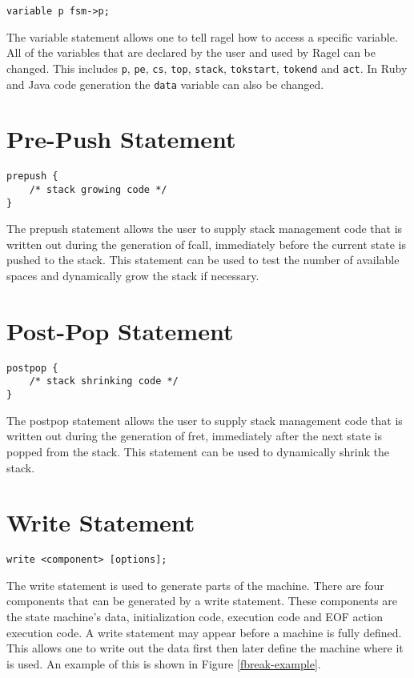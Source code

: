 \documentclass[letterpaper,11pt,oneside]{book}
\newcommand{\verbspace}{\vspace{10pt}}
\begin{document}
\begin{verbatim}
variable p fsm->p;
\end{verbatim}
\verbspace

The variable statement allows one to tell ragel how to access a specific
variable. All of the variables that are declared by the user and
used by Ragel can be changed. This includes \verb|p|, \verb|pe|, \verb|cs|,
\verb|top|, \verb|stack|, \verb|tokstart|, \verb|tokend| and \verb|act|.
In Ruby and Java code generation the \verb|data| variable can also be changed.

\section{Pre-Push Statement}
\label{prepush}

\begin{verbatim}
prepush { 
	/* stack growing code */
}
\end{verbatim}
\verbspace

The prepush statement allows the user to supply stack management code that is
written out during the generation of fcall, immediately before the current
state is pushed to the stack. This statement can be used to test the number of
available spaces and dynamically grow the stack if necessary.

\section{Post-Pop Statement}
\label{postpop}

\begin{verbatim}
postpop { 
	/* stack shrinking code */
}
\end{verbatim}
\verbspace

The postpop statement allows the user to supply stack management code that is
written out during the generation of fret, immediately after the next state is
popped from the stack. This statement can be used to dynamically shrink the
stack.

\section{Write Statement}
\label{write-statement}

\begin{verbatim}
write <component> [options];
\end{verbatim}
\verbspace


The write statement is used to generate parts of the machine. 
There are four
components that can be generated by a write statement. These components are the
state machine's data, initialization code, execution code and EOF action
execution code. A write statement may appear before a machine is fully defined.
This allows one to write out the data first then later define the machine where
it is used. An example of this is shown in Figure \ref{fbreak-example}.
\end{document}
